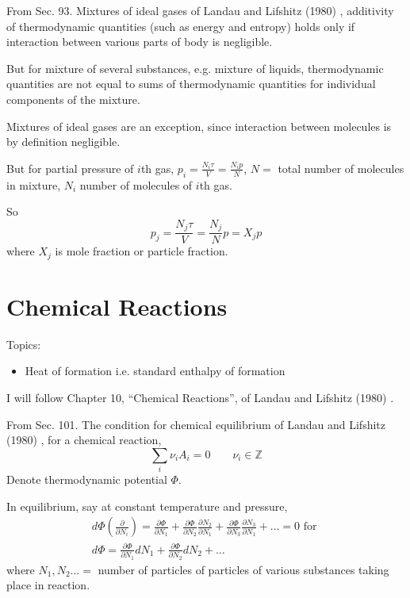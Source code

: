 \documentclass[10pt]{amsart}
\begin{document}
\begin{multicols*}{2}
From Sec. 93. Mixtures of ideal gases of Landau and Lifshitz (1980) \cite{LLandauELifshitz1980}, additivity of thermodynamic quantities (such as energy and entropy) holds only if interaction between various parts of body is negligible. 

But for mixture of several substances, e.g. mixture of liquids, thermodynamic quantities are not equal to sums of thermodynamic quantities for individual components of the mixture. 

Mixtures of ideal gases are an exception, since interaction between molecules is by definition negligible.  

But for partial pressure of $i$th gas, $p_i = \frac{N_i\tau}{V} = \frac{N_i p}{N}$, $N = $ total number of molecules in mixture, $N_i$ number of molecules of $i$th gas.  

So
\[
p_j = \frac{ N_j \tau }{V} = \frac{ N_j}{N} p = X_j p 
\]
where $X_j$ is mole fraction or particle fraction.  




\section{Chemical Reactions}
Topics:
\begin{itemize}
  \item Heat of formation i.e. standard enthalpy of formation
\end{itemize}

I will follow Chapter 10, ``Chemical Reactions'', of Landau and Lifshitz (1980) \cite{LLandauELifshitz1980}.  

From Sec. 101. The condition for chemical equilibrium of Landau and Lifshitz (1980) \cite{LLandauELifshitz1980}, for a chemical reaction,
\[
\sum_i \nu_i A_i = 0 \qquad \nu_i \in \mathbb{Z}
\]
Denote thermodynamic potential $\Phi$.  

In equilibrium, say at constant temperature and pressure, 
\[
\begin{gathered}
  d\Phi\left( \frac{ \partial }{ \partial N_i} \right) = \frac{ \partial \Phi}{ \partial N_1} + \frac{ \partial \Phi}{ \partial N_2} \frac{ \partial N_2}{ \partial N_1} + \frac{ \partial \Phi}{ \partial N_3} \frac{ \partial N_3}{ \partial N_1} + \dots = 0 \text{ for }  \\
  d\Phi = \frac{ \partial \Phi}{ \partial N_1} dN_1 + \frac{ \partial \Phi}{ \partial N_2} dN_2 + \dots 
\end{gathered}
\]
where $N_1, N_2 \dots =$ number of particles of particles of various substances taking place in reaction. 


\end{multicols*}
\end{document}
